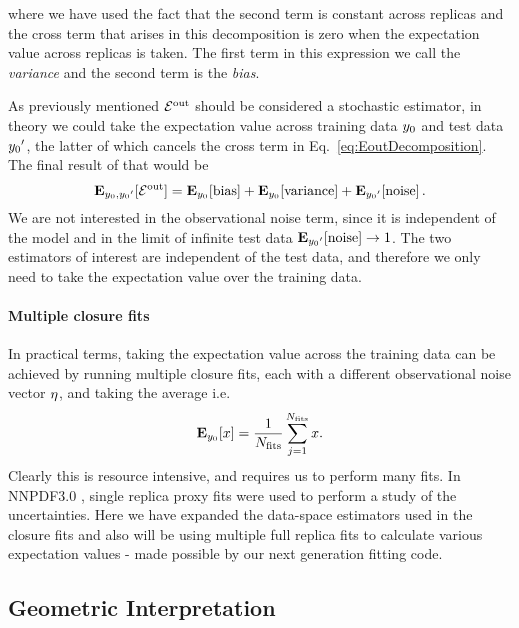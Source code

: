 where we have used the fact that the second term is constant across replicas and
the cross term that arises in this decomposition is zero when the expectation
value across replicas is taken. The first term in this expression we call the
{\em variance} and the second term is the {\em bias}.

As previously mentioned $\mathcal{E}^{\rm out}$ should be considered a stochastic estimator, in
theory we could take the expectation value across training data $y_0$ and
test data ${{y_0}^{\prime}}$, the latter of which cancels the cross term in
Eq.~\ref{eq:EoutDecomposition}. The final result of that would be
\begin{equation}\label{eq:ExpectedBiasVariance}
    \mathbf{E}_{y_0, {{y_0}^{\prime}}}[\mathcal{E}^{\rm out}] =
    \mathbf{E}_{y_0}[{\rm bias}] + 
    \mathbf{E}_{y_0}[{\rm variance}] +
    \mathbf{E}_{{{y_0}^{\prime}}}[{\rm noise}]\, .
\end{equation}
We are not interested in the observational noise term, since it is
independent of the model and in the limit of infinite test data
$\mathbf{E}_{{{y_0}^{\prime}}}[{\rm noise}] \to 1$.
The two estimators of interest are independent of
the test data, and therefore we only need to take the expectation value over
the training data.

\paragraph{Multiple closure fits}
In practical terms, taking the expectation value across the training data can
be achieved by running multiple closure fits, each with a different
observational noise vector $\eta$, and taking the average i.e.
\begin{equation}
    \mathbf{E}_{y_0}[ x ] = \frac{1}{N_{\rm fits}} \sum_{j=1}^{N_{\rm fits}} x.
\end{equation}
Clearly this is resource intensive, and requires us to perform many fits. In
NNPDF3.0 \cite{nnpdf30}, single replica proxy fits were used to perform a study
of the uncertainties. Here we have expanded the data-space estimators used in
the closure fits and also will be using multiple full replica fits to
calculate various expectation values - made possible by our next generation
fitting code.

\subsection{Geometric Interpretation}

